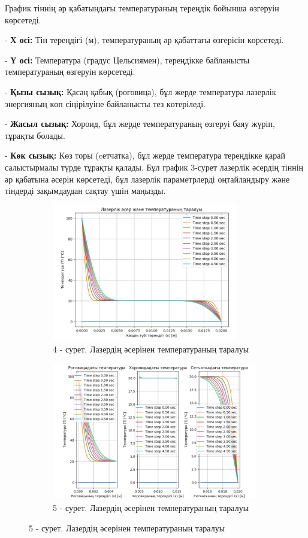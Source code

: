 \begin{multicols}{2}
График тіннің әр қабатындағы температураның тереңдік бойынша өзгеруін
көрсетеді.

- {\bfseries Х осі:} Тін тереңдігі (м), температураның әр қабаттағы
өзгерісін көрсетеді.

- {\bfseries Ү осі:} Температура (градус Цельсиямен), тереңдікке байланысты
температураның өзгеруін көрсетеді.

- {\bfseries Қызы сызық:} Қасаң қабық (роговица), бұл жерде температура
лазерлік энергияның көп сіңірілуіне байланысты тез көтеріледі.

- {\bfseries Жасыл сызық:} Хороид, бұл жерде температураның өзгеруі баяу
жүріп, тұрақты болады.

- {\bfseries Көк сызық:} Көз торы (cетчатка), бұл жерде температура
тереңдікке қарай салыстырмалы түрде тұрақты қалады.
Бұл график 3-сурет лазерлік әсердің тіннің әр қабатына әсерін көрсетеді,
бұл лазерлік параметрлерді оңтайландыру және тіндерді зақымдаудан сақтау
үшін маңызды.
\end{multicols}

\begin{figure}[H]
	\centering
	\begin{subfigure}[b]{0.45\textwidth}
		\centering
		\includegraphics[height=6cm]{media/ict/image23}
		\caption*{4 - сурет. Лазердің әсерінен температураның таралуы}
	\end{subfigure}
	\begin{subfigure}[b]{0.45\textwidth}
		\centering
		\includegraphics[height=6cm]{media/ict/image24}
		\caption*{5 - сурет. Лазердің әсерінен температураның таралуы}
	\end{subfigure}
\end{figure}


